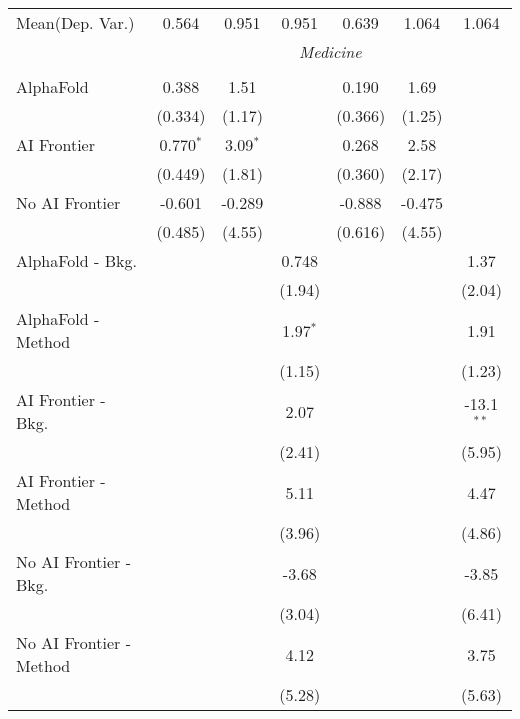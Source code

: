 \begin{tabular}{lcccccc}
Mean(Dep. Var.) & 0.564 & 0.951 & 0.951 & 0.639 & 1.064 & 1.064 \\
 & \multicolumn{6}{c}{\textit{Medicine}} \\ \\
   AlphaFold               & 0.388       & 1.51       &            & 0.190   & 1.69   &   \\   
                           & (0.334)     & (1.17)     &            & (0.366) & (1.25) &   \\   
   AI Frontier             & 0.770$^{*}$ & 3.09$^{*}$ &            & 0.268   & 2.58   &   \\   
                           & (0.449)     & (1.81)     &            & (0.360) & (2.17) &   \\   
   No AI Frontier          & -0.601      & -0.289     &            & -0.888  & -0.475 &   \\   
                           & (0.485)     & (4.55)     &            & (0.616) & (4.55) &   \\   
   AlphaFold - Bkg.        &             &            & 0.748      &         &        & 1.37\\   
                           &             &            & (1.94)     &         &        & (2.04)\\   
   AlphaFold - Method      &             &            & 1.97$^{*}$ &         &        & 1.91\\   
                           &             &            & (1.15)     &         &        & (1.23)\\   
   AI Frontier - Bkg.      &             &            & 2.07       &         &        & -13.1$^{**}$\\   
                           &             &            & (2.41)     &         &        & (5.95)\\   
   AI Frontier - Method    &             &            & 5.11       &         &        & 4.47\\   
                           &             &            & (3.96)     &         &        & (4.86)\\   
   No AI Frontier - Bkg.   &             &            & -3.68      &         &        & -3.85\\   
                           &             &            & (3.04)     &         &        & (6.41)\\   
   No AI Frontier - Method &             &            & 4.12       &         &        & 3.75\\   
                           &             &            & (5.28)     &         &        & (5.63)\\   

\end{tabular}
